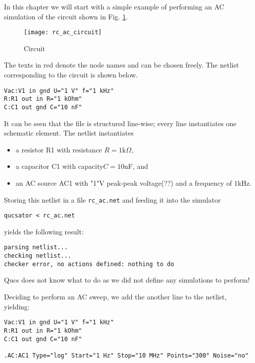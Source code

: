 
In this chapter we will start with a simple example of performing an AC simulation of the circuit shown in Fig. \ref{fig:rc_ac_circuit}.

\begin{figure}[h]
\begin{center}
	\texttt{[image: rc\_ac\_circuit]}
	\caption{Circuit}
	\label{fig:rc_ac_circuit}
\end{center}
\end{figure}

The texts in red denote the node names and can be chosen freely. The netlist corresponding to the circuit is shown below.

\begin{verbatim}
Vac:V1 in gnd U="1 V" f="1 kHz"
R:R1 out in R="1 kOhm"
C:C1 out gnd C="10 nF"
\end{verbatim}

It can be seen that the file is structured line-wise; every line instantiates one schematic element. The netlist instantiates

\begin{itemize}
\item a resistor R1 with resistance $R=1\text{k}\Omega$,
\item a capacitor C1 with capacity$C=10$nF, and
\item an AC source AC1 with "1"V peak-peak voltage(??) and a frequency of $1$kHz.
\end{itemize}

 Storing this netlist in a file \verb+rc_ac.net+ and feeding it into the simulator

\begin{verbatim}
qucsator < rc_ac.net
\end{verbatim}

yields the following result:

\begin{verbatim}
parsing netlist...
checking netlist...
checker error, no actions defined: nothing to do
\end{verbatim}

Qucs does not know what to do as we did not define any simulations to perform!


Deciding to perform an AC sweep, we add the another line to the netlist, yielding:

\begin{verbatim}
Vac:V1 in gnd U="1 V" f="1 kHz"
R:R1 out in R="1 kOhm"
C:C1 out gnd C="10 nF"

.AC:AC1 Type="log" Start="1 Hz" Stop="10 MHz" Points="300" Noise="no"
\end{verbatim}

